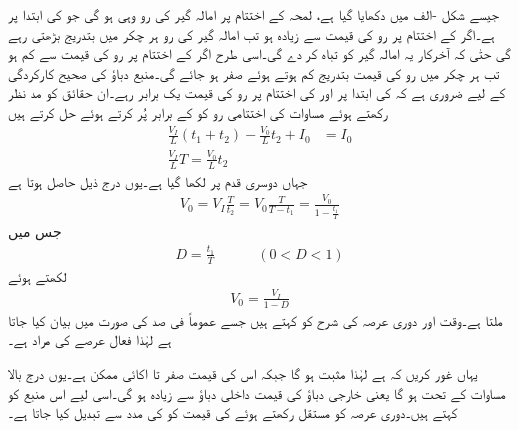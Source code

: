 جیسے شکل -الف میں دکھایا گیا ہے، لمحہ  کے اختتام پر امالہ گیر کی رو وہی ہو گی جو  کی ابتدا پر ہے۔اگر  کے اختتام پر رو کی قیمت  سے زیادہ ہو تب امالہ گیر کی رو ہر چکر میں بتدریج بڑھتی رہے گی حتٰی کہ آخرکار یہ امالہ گیر کو تباہ کر دے گی۔اسی طرح اگر  کے اختتام پر رو کی قیمت  سے کم ہو تب ہر چکر میں رو کی قیمت بتدریج کم ہوتے ہوئے صفر ہو جائے گی۔منبع دباؤ کی صحیح کارکردگی کے لیے ضروری ہے کہ  کی ابتدا پر اور  کی اختتام پر رو کی قیمت یک برابر رہے۔ان حقائق کو مد نظر رکھتے ہوئے مساوات  کی اختتامی رو کو  کے برابر پُر کرتے ہوئے حل کرتے ہیں
\begin{align*}
\frac{V_I}{L}(t_1+t_2)-\frac{V_0}{L}t_2+I_0 &=I_0\\
\frac{V_I}{L}T=\frac{V_0}{L}t_2
\end{align*}
جہاں دوسری قدم پر  لکھا گیا ہے۔یوں درج ذیل حاصل ہوتا ہے
\begin{align*}
V_0=V_I \frac{T}{t_2}=V_0 \frac{T}{T-t_1}=\frac{V_0}{1-\frac{t_1}{T}}
\end{align*}
جس میں
\begin{align}
D=\frac{t_1}{T}\quad \quad \quad (0< D < 1)
\end{align}
لکھتے ہوئے
\begin{align}
V_0=\frac{V_I}{1-D}
\end{align}
ملتا ہے۔وقت  اور دوری عرصہ  کی شرح  کو  کہتے ہیں جسے عموماً فی صد کی صورت میں بیان کیا جاتا ہے لہٰذا  فعال عرصے کی مراد  ہے۔

یہاں غور کریں کہ  ہے لہٰذا   مثبت ہو گا جبکہ اس کی قیمت صفر تا اکائی  ممکن ہے۔یوں درج بالا مساوات کے تحت  ہو گا یعنی خارجی دباؤ کی قیمت داخلی دباؤ سے زیادہ ہو گی۔اسی لیے اس منبع کو  کہتے ہیں۔دوری عرصہ  کو مستقل رکھتے ہوئے  کی قیمت کو  کی مدد سے تبدیل کیا جاتا ہے۔


